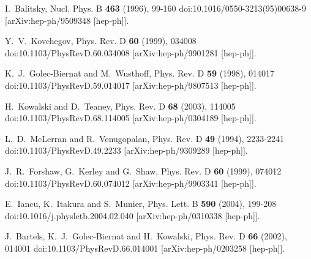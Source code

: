 I.~Balitsky,
Nucl. Phys. B \textbf{463} (1996), 99-160
doi:10.1016/0550-3213(95)00638-9
[arXiv:hep-ph/9509348 [hep-ph]].

Y.~V.~Kovchegov,
Phys. Rev. D \textbf{60} (1999), 034008
doi:10.1103/PhysRevD.60.034008
[arXiv:hep-ph/9901281 [hep-ph]].

K.~J.~Golec-Biernat and M.~Wusthoff,
Phys. Rev. D \textbf{59} (1998), 014017
doi:10.1103/PhysRevD.59.014017
[arXiv:hep-ph/9807513 [hep-ph]].

H.~Kowalski and D.~Teaney,
Phys. Rev. D \textbf{68} (2003), 114005
doi:10.1103/PhysRevD.68.114005
[arXiv:hep-ph/0304189 [hep-ph]].

L.~D.~McLerran and R.~Venugopalan,
Phys. Rev. D \textbf{49} (1994), 2233-2241
doi:10.1103/PhysRevD.49.2233
[arXiv:hep-ph/9309289 [hep-ph]].

J.~R.~Forshaw, G.~Kerley and G.~Shaw,
Phys. Rev. D \textbf{60} (1999), 074012
doi:10.1103/PhysRevD.60.074012
[arXiv:hep-ph/9903341 [hep-ph]].

E.~Iancu, K.~Itakura and S.~Munier,
Phys. Lett. B \textbf{590} (2004), 199-208
doi:10.1016/j.physletb.2004.02.040
[arXiv:hep-ph/0310338 [hep-ph]].

J.~Bartels, K.~J.~Golec-Biernat and H.~Kowalski,
Phys. Rev. D \textbf{66} (2002), 014001
doi:10.1103/PhysRevD.66.014001
[arXiv:hep-ph/0203258 [hep-ph]].


